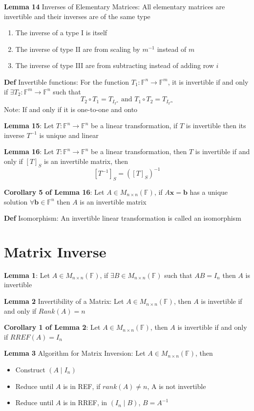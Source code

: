 \documentclass[11pt,notitlepage]{report}
\newcommand{\bb}[1]{\ensuremath{\mathbb{#1}}}
\newcommand{\tbf}[1]{\textbf{#1}}
\begin{document}
\textbf{Lemma 14} Inverses of Elementary Matrices: All elementary matrices are invertible and their inverses are of the same type
\begin{enumerate}[label=(\Roman*)]
    \item The inverse of a type I is itself
    \item The inverse of type II are from scaling by $m^{-1}$ instead of $m$
    \item The inverse of type III are from subtracting instead of adding row $i$
\end{enumerate}

\textbf{Def} Invertible functions: For the function $T_1: \bb F^n \rightarrow \bb F^m$, it is invertible if and only if $\exists T_2: \bb F^m \rightarrow \bb F^n$ such that
$$T_2 \circ T_1 = T_{I_{\bb F^n}} \text{ and } T_1 \circ T_2 = T_{I_{\bb F^m}}$$
\hspace*{5mm} Note: If and only if it is one-to-one and onto

\textbf{Lemma 15}: Let $T: \bb F^n \rightarrow \bb F^n$ be a linear transformation, if $T$ is invertible then its inverse $T^{-1}$ is unique and linear

\textbf{Lemma 16}: Let $T: \bb F^n \rightarrow \bb F^n$ be a linear transformation, then $T$ is invertible if and only if $[T]_S$ is an invertible matrix, then
$$[T^{-1}]_S = ([T]_S)^{-1}$$

\textbf{Corollary 5 of Lemma 16}: Let $A \in M_{n \times n}(\bb F)$, if $A\tbf x = \tbf b$ has a unique solution $\forall \tbf b \in \bb F^n$ then $A$ is an invertible matrix

\textbf{Def} Isomorphism: An invertible linear transformation is called an isomorphism

\newpage
\section{Matrix Inverse}

\textbf{Lemma 1}: Let $A \in M_{n \times n}(\bb F)$, if $\exists B \in M_{n \times n}(\bb F)$ such that $AB = I_n$ then $A$ is invertible

\textbf{Lemma 2} Invertibility of a Matrix: Let $A \in M_{n \times n}(\bb F)$, then $A$ is invertible if and only if $Rank(A) = n$

\textbf{Corollary 1 of Lemma 2}: Let $A \in M_{n \times n}(\bb F)$, then $A$ is invertible if and only if $RREF(A) = I_n$

\textbf{Lemma 3} Algorithm for Matrix Inversion: Let $A \in M_{n \times n}(\bb F)$, then 
\begin{itemize}
    \item Construct $(A \mid I_n)$
    \item Reduce until $A$ is in REF, if $rank(A) \ne n$, A is not invertible
    \item Reduce until $A$ is in RREF, in $(I_n \mid B)$, $B = A^{-1}$
\end{itemize}
\end{document}
